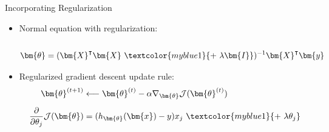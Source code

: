 \begin{frame}{Incorporating Regularization}{}
	\vspace*{3mm}
	\begin{itemize}
		\item Normal equation with regularization: \\
		 \\[-0.5mm]
		\begin{equation}
			\bm{\theta} = (\bm{X}^{\intercal} \bm{X}\ \textcolor{myblue1}{+\ \lambda \bm{I}})^{-1}
				\bm{X}^{\intercal} \bm{y}
		\end{equation}
		\item Regularized gradient descent update rule:
		\begin{align*}
			\bm{\theta}^{(t+1)}
				&\longleftarrow \bm{\theta}^{(t)}
					- \alpha \nabla_{\bm{\theta}}\mathcal{J}(\bm{\theta}^{(t)}) \\[2mm]
			\frac{\partial}{\partial \theta_j} \mathcal{J}(\bm{\theta})
				&= (h_{\bm{\theta}}(\bm{x}) - y) x_j\ \textcolor{myblue1}{+\ \lambda \theta_j}
		\end{align*}
	\end{itemize}
\end{frame}


